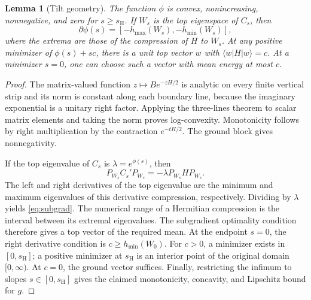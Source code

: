 \documentclass[11pt,a4paper]{article}
\newtheorem{lemma}[theorem]{Lemma}
\theoremstyle{remark}
\newcommand{\ket}[1]{|#1\rangle}
\newcommand{\bra}[1]{\langle #1|}
\newcommand{\sh}{s_{\mathrm H}}
\begin{document}
\begin{lemma}[Tilt geometry]\label{lem:geometry}
The function \(\phi\) is convex, nonincreasing, nonnegative, and zero for
\(s\geq\sh\). If \(W_s\) is the top eigenspace of \(C_s\), then
\begin{equation}\label{eq:subgrad}
 \partial\phi(s)=[-h_{\max}(W_s),-h_{\min}(W_s)],
\end{equation}
where the extrema are those of the compression of \(H\) to \(W_s\).
At any positive minimizer of \(\phi(s)+sc\), there is a unit top vector
\(w\) with \(\bra wH\ket w=c\). At a minimizer \(s=0\), one can choose
such a vector with mean energy at most \(c\).
\end{lemma}
\begin{proof}
The matrix-valued function \(z\mapsto Be^{-zH/2}\) is analytic on every
finite vertical strip and its norm is constant along each boundary line,
because the imaginary exponential is a unitary right factor.
Applying the three-lines theorem to scalar matrix elements and taking
the norm proves log-convexity. Monotonicity follows by right multiplication
by the contraction \(e^{-tH/2}\). The ground block gives nonnegativity.

If the top eigenvalue of \(C_s\) is \(\lambda=e^{\phi(s)}\), then
\[
 P_{W_s}C_s'P_{W_s}=-\lambda P_{W_s}HP_{W_s}.
\]
The left and right derivatives of the top eigenvalue are the minimum
and maximum eigenvalues of this derivative compression, respectively.
Dividing by \(\lambda\) yields \eqref{eq:subgrad}.
The numerical range of a Hermitian compression is the interval between
its extremal eigenvalues. The subgradient optimality condition therefore
gives a top vector of the required mean. At the endpoint \(s=0\), the
right derivative condition is \(c\geq h_{\min}(W_0)\).
For \(c>0\), a minimizer exists in \([0,\sh]\); a positive minimizer at
\(\sh\) is an interior point of the original domain \([0,\infty)\).
At \(c=0\), the ground vector suffices.
Finally, restricting the infimum to slopes \(s\in[0,\sh]\) gives the
claimed monotonicity, concavity, and Lipschitz bound for \(g\).
\end{proof}
\end{document}
